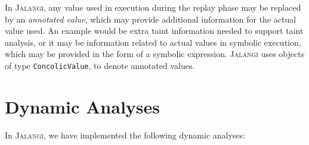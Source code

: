 \documentclass{sig-alternate}
\def\jalangi{\textsc{Jalangi}}
\newcommand \Shadow{{\tt getSymbolic}}
\begin{document}
In \jalangi{}, any value used in execution during the replay phase may
be replaced by an \emph{annotated value}, which may provide additional
information for the actual value used.  An example would be extra
taint information needed to support taint analysis, or it may be
information related to actual values in symbolic execution, which may
be provided in the form of a symbolic expression.  \jalangi{} uses
objects of type \texttt{ConcolicValue}, to denote annotated values.


\section{Dynamic Analyses}
\label{sec:dynamic-analyses}

In \jalangi{}, we have implemented the following dynamic analyses:
\end{document}
